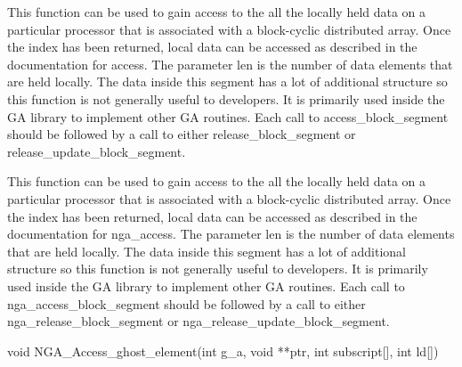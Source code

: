 \documentclass[12pt]{article}
\begin{document}
\begin{pydesc}
This function can be used to gain access to the all the locally held data on a
particular processor that is associated with a block-cyclic distributed array.
Once the index has been returned, local data can be accessed as described in
the documentation for access. The parameter len is the number of data
elements that are held locally. The data inside this segment has a lot of
additional structure so this function is not generally useful to developers. It
is primarily used inside the GA library to implement other GA routines. Each
call to access_block_segment should be followed by a call to either
release_block_segment or release_update_block_segment.
\end{pydesc}

\begin{fdesc}
This function can be used to gain access to the all the locally held data on a
particular processor that is associated with a block-cyclic distributed array.
Once the index has been returned, local data can be accessed as described in
the documentation for nga_access. The parameter len is the number of data
elements that are held locally. The data inside this segment has a lot of
additional structure so this function is not generally useful to developers. It
is primarily used inside the GA library to implement other GA routines. Each
call to nga_access_block_segment should be followed by a call to either
nga_release_block_segment or nga_release_update_block_segment.
\end{fdesc}



\begin{capi}
\begin{ccode}
void NGA_Access_ghost_element(int g_a, void **ptr, int subscript[],
                              int ld[])
\end{ccode}
\begin{funcargs}
\end{funcargs}
\end{capi}
\end{document}
